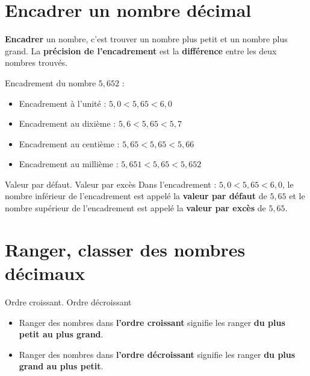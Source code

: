 \begin{pageCours}

\section{Encadrer un nombre décimal}

\begin{Def}
\textbf{Encadrer} un nombre, c'est trouver un nombre plus petit et un nombre plus grand. La \textbf{précision de l'encadrement} est la \textbf{différence} entre les deux nombres trouvés.
\end{Def}

\begin{Ex}
Encadrement du nombre $5,652$ :
 \begin{itemize}[leftmargin=*]
\item Encadrement à l'unité : \(5,0 < 5,65< 6,0\)

\item Encadrement au dixième : \(5,6 < 5,65< 5,7\)
\item Encadrement au centième : \(5,65 < 5,65< 5,66\)
\item Encadrement au millième : \(5,651 < 5,65< 5,652\)
 \end{itemize}
\end{Ex}


\begin{DefT}{Valeur par défaut.  Valeur par excès}
Dans l'encadrement  : \(5,0 < 5,65 < 6,0\), le nombre inférieur de l'encadrement est appelé la \textbf{valeur par défaut} de $5,65$ et le nombre supérieur de l'encadrement est appelé la \textbf{valeur par excès} de $5,65$.
\end{DefT}



\section{Ranger, classer des nombres décimaux}

\begin{DefT}{Ordre croissant. Ordre décroissant}
\begin{itemize}[leftmargin=*]
\item Ranger des nombres dans \textbf{l'ordre croissant} signifie les ranger \textbf{du plus petit au plus grand}.
\item Ranger des nombres dans \textbf{l'ordre décroissant} signifie les ranger \textbf{du plus grand au plus petit}.
\end{itemize}
\end{DefT}

\end{pageCours}

